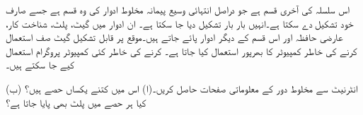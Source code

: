 اس سلسلہ کی آخری قسم  ہے جو دراصل انتہائی وسیع پیمانہ مخلوط ادوار کی وہ قسم ہے جسے صارف خود تشکیل دے سکتا ہے۔انہیں بار بار تشکیل دیا جا سکتا ہے۔ ان ادوار میں گیٹ، پلٹ، شناخت کار، عارضی حافظہ اور اس قسم کے دیگر ادوار پائے جاتے ہیں۔موقع پر قابل تشکیل گیٹ صف استعمال کرنے کی خاطر کمپیوٹر کا بھرپور استعمال کیا جاتا ہے۔  کرنے کی خاطر کئی کمپیوٹر پروگرام استعمال کیے جا سکتے ہیں۔ 

انٹرنیٹ سے  مخلوط دور کے معلوماتی صفحات حاصل کریں۔(ا) اس میں کتنے یکساں حصے ہیں؟ (ب) کیا ہر حصے میں پلٹ بھی پایا جاتا ہے؟
